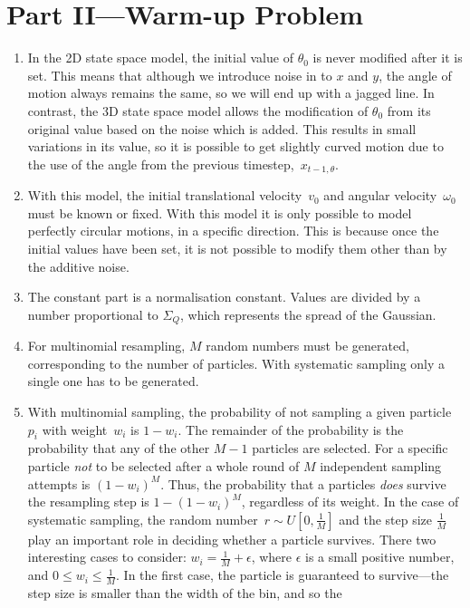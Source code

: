 \documentclass[a4paper,12pt]{article}
\begin{document}
\section{Part II---Warm-up Problem}
\begin{enumerate}
\item In the 2D state space model, the initial value of $\theta_0$ is never
  modified after it is set. This means that although we introduce noise in to
  $x$ and $y$, the angle of motion always remains the same, so we will end up
  with a jagged line. In contrast, the 3D state space model allows the
  modification of $\theta_0$ from its original value based on the noise which is
  added. This results in small variations in its value, so it is possible to get
  slightly curved motion due to the use of the angle from the previous
  timestep,~$x_{t-1,\theta}$.
\item With this model, the initial translational velocity~$v_0$ and angular
  velocity~$\omega_0$ must be known or fixed. With this model it is only
  possible to model perfectly circular motions, in a specific
  direction. This is because once the initial values have been set, it is not
  possible to modify them other than by the additive noise.
\item The constant part is a normalisation constant. Values are divided by a
  number proportional to $\Sigma_Q$, which represents the spread of the
  Gaussian.
\item For multinomial resampling, $M$ random numbers must be generated,
  corresponding to the number of particles. With systematic sampling only a
  single one has to be generated.
\item With multinomial sampling, the probability of not sampling a given
  particle~$p_i$ with weight~$w_i$ is $1-w_i$. The remainder of the probability
  is the probability that any of the other $M-1$ particles are selected. For a
  specific particle \emph{not} to be selected after a whole round of $M$
  independent sampling attempts is $(1-w_i)^M$. Thus, the probability that a
  particles \emph{does} survive the resampling step is $1-(1-w_i)^M$, regardless
  of its weight. In the case of systematic sampling, the random number~$r\sim
  U[0,\frac{1}{M}]$ and the step size $\frac{1}{M}$ play an important role in
  deciding whether a particle survives. There two interesting cases to consider:
  $w_i=\frac{1}{M}+\epsilon$, where $\epsilon$ is a small positive number, and
  $0\le w_i\le\frac{1}{M}$. In the first case, the particle is guaranteed to
  survive---the step size is smaller than the width of the bin, and so the

\end{enumerate}
\end{document}
